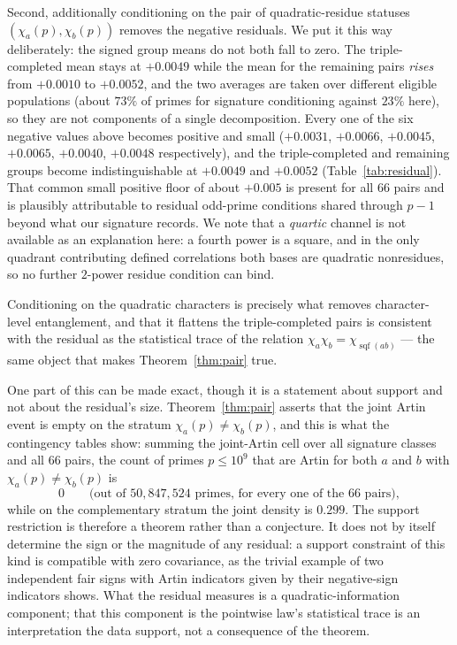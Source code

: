 \documentclass[11pt,reqno]{amsart}
\theoremstyle{plain}
\theoremstyle{definition}
\DeclareMathOperator{\sqf}{sqf}
\begin{document}
Second, additionally conditioning on the pair of quadratic-residue statuses $(\chi_a(p), \chi_b(p))$ removes the negative residuals. We put it this way deliberately: the signed group means do not both fall to zero. The triple-completed mean stays at $+0.0049$ while the mean for the remaining pairs \emph{rises} from $+0.0010$ to $+0.0052$, and the two averages are taken over different eligible populations (about $73\%$ of primes for signature conditioning against $23\%$ here), so they are not components of a single decomposition. Every one of the
six negative values above becomes positive and small
($+0.0031$, $+0.0066$, $+0.0045$, $+0.0065$, $+0.0040$, $+0.0048$
respectively), and the triple-completed and remaining groups become indistinguishable at $+0.0049$ and $+0.0052$ (Table~\ref{tab:residual}).
That common small positive floor of about $+0.005$ is present for all $66$
pairs and is plausibly attributable to residual odd-prime conditions shared through $p-1$ beyond what our signature records. We note that a \emph{quartic} channel is not available as an explanation here: a fourth power is a square, and in the only quadrant contributing defined correlations both bases are quadratic nonresidues, so no further $2$-power residue condition can bind.

Conditioning on the quadratic characters is precisely what removes
character-level entanglement, and that it flattens the triple-completed pairs is consistent with the residual as the statistical trace of the relation
$\chi_a \chi_b = \chi_{\sqf(ab)}$ --- the same object that makes
Theorem~\ref{thm:pair} true.

One part of this can be made exact, though it is a statement about support and not about the residual's size.
Theorem~\ref{thm:pair} asserts that the joint Artin event is empty on the
stratum $\chi_a(p) \ne \chi_b(p)$, and this is what the contingency tables
show: summing the joint-Artin cell over all signature classes and all $66$
pairs, the count of primes $p \le 10^9$ that are Artin for both $a$ and $b$
with $\chi_a(p) \ne \chi_b(p)$ is
\[
  0 \qquad \text{(out of } 50{,}847{,}524 \text{ primes, for every one of the
  } 66 \text{ pairs)},
\]
while on the complementary stratum the joint density is $0.299$. The support restriction is therefore a theorem rather than a conjecture. It does not by itself determine the sign or the magnitude of any residual: a support constraint of this kind is compatible with zero covariance, as the trivial example of two independent fair signs with Artin indicators given by their negative-sign indicators shows. What the residual measures is a quadratic-information component; that this component is the pointwise law's statistical trace is an interpretation the data support, not a consequence of the theorem.
\end{document}
